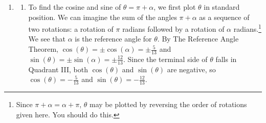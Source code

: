 \documentclass{ximera}
\begin{document}
\begin{example}
\begin{explanation}
\begin{enumerate}
\begin{image}

\end{image}

The Pythagorean Theorem gives $\left(\frac{5}{13}\right)^2 + y^2 = 1^2$ or $y = \frac{12}{13}$.  Hence, $\sin(\alpha) = \frac{12}{13}$.

\item \begin{enumerate} \item To find the cosine and sine of $\theta = \pi + \alpha$, we first plot $\theta$ in standard position. We can imagine the sum of the angles $\pi + \alpha$ as a sequence of two rotations: a rotation of $\pi$ radians followed by a rotation of  $\alpha$ radians.\footnote{Since $\pi + \alpha = \alpha + \pi$, $\theta$ may be plotted by reversing the order of rotations given here. You should do this.}  We see that $\alpha$ is the reference angle for $\theta$.  By The Reference Angle Theorem,  $\cos(\theta) = \pm \cos(\alpha) = \pm \frac{5}{13}$ and $\sin(\theta) = \pm \sin(\alpha) = \pm \frac{12}{13}$. Since the terminal side of $\theta$ falls in Quadrant III, both $\cos(\theta)$ and $\sin(\theta)$ are negative, so $\cos(\theta) = - \frac{5}{13}$ and $\sin(\theta) = - \frac{12}{13}$.

\begin{image}
\end{image}
\end{enumerate}
\end{enumerate}
\end{explanation}
\end{example}
\end{document}
